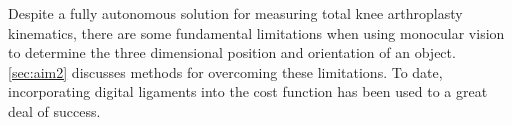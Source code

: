 Despite a fully autonomous solution for measuring total knee arthroplasty kinematics, there are some fundamental limitations when using monocular vision to determine the three dimensional position and orientation of an object.
\cref{sec:aim2} discusses methods for overcoming these limitations.
To date, incorporating digital ligaments into the cost function has been used to a great deal of success.
